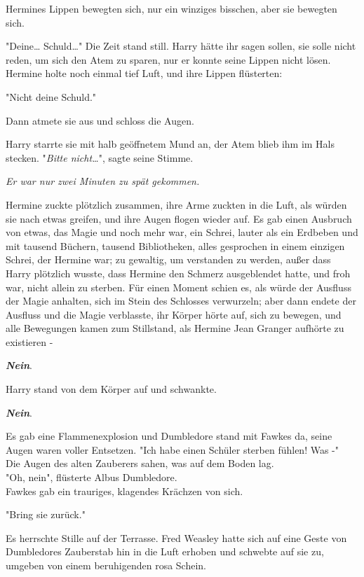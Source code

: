 {Hermines Lippen bewegten sich, nur ein winziges bisschen, aber sie bewegten sich.

"Deine… Schuld…" Die Zeit stand still. Harry hätte ihr sagen sollen, sie solle nicht reden, um sich den Atem zu sparen, nur er konnte seine Lippen nicht lösen.\\ Hermine holte noch einmal tief Luft, und ihre Lippen flüsterten:

"Nicht deine Schuld."

Dann atmete sie aus und schloss die Augen.

Harry starrte sie mit halb geöffnetem Mund an, der Atem blieb ihm im Hals stecken. "\emph{Bitte nicht…}", sagte seine Stimme.

\emph{Er war nur zwei Minuten zu spät gekommen.}

Hermine zuckte plötzlich zusammen, ihre Arme zuckten in die Luft, als würden sie nach etwas greifen, und ihre Augen flogen wieder auf. Es gab einen Ausbruch von etwas, das Magie und noch mehr war, ein Schrei, lauter als ein Erdbeben und mit tausend Büchern, tausend Bibliotheken, alles gesprochen in einem einzigen Schrei, der Hermine war; zu gewaltig, um verstanden zu werden, außer dass Harry plötzlich wusste, dass Hermine den Schmerz ausgeblendet hatte, und froh war, nicht allein zu sterben. Für einen Moment schien es, als würde der Ausfluss der Magie anhalten, sich im Stein des Schlosses verwurzeln; aber dann endete der Ausfluss und die Magie verblasste, ihr Körper hörte auf, sich zu bewegen, und alle Bewegungen kamen zum Stillstand, als Hermine Jean Granger aufhörte zu existieren -

\textbf{\emph{Nein}}.

Harry stand von dem Körper auf und schwankte.

\textbf{\emph{Nein}}.

Es gab eine Flammenexplosion und Dumbledore stand mit Fawkes da, seine Augen waren voller Entsetzen. "Ich habe einen Schüler sterben fühlen! Was -"\\ Die Augen des alten Zauberers sahen, was auf dem Boden lag.\\ "Oh, nein", flüsterte Albus Dumbledore.\\ Fawkes gab ein trauriges, klagendes Krächzen von sich.

"Bring sie zurück."

Es herrschte Stille auf der Terrasse. Fred Weasley hatte sich auf eine Geste von Dumbledores Zauberstab hin in die Luft erhoben und schwebte auf sie zu, umgeben von einem beruhigenden rosa Schein.

}
